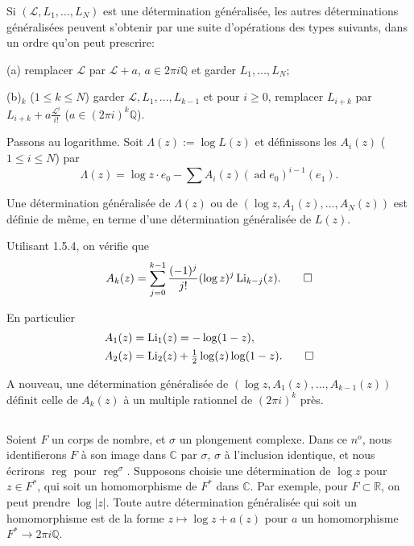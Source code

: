 \documentclass[12pt,a4paper]{article}
\theoremstyle{plain}
\theoremstyle{definition}
\theoremstyle{remark}
\DeclareMathOperator{\reg}{reg}
\DeclareMathOperator{\ad}{ad}
\newcommand{\Q}{\mathbb{Q}}
\newcommand{\R}{\mathbb{R}}
\newcommand{\C}{\mathbb{C}}
\begin{document}
Si $(\mathcal{L},L_1,\ldots,L_N)$ est une d\'etermination g\'en\'eralis\'ee, les autres d\'eterminations g\'en\'eralis\'ees peuvent s'obtenir par une suite d'op\'erations des types suivants, dans un ordre qu'on peut prescrire:

(a) remplacer $\mathcal{L}$ par $\mathcal{L}+a$, $a\in 2\pi i\Q$ et garder $L_1,\ldots,L_N$;

(b)$_k$ ($1\leq k\leq N$) garder $\mathcal{L},L_1,\ldots,L_{k-1}$ et pour $i\geq 0$, remplacer $L_{i+k}$ par $L_{i+k}+a\frac{\mathcal{L}^i}{i!}$ ($a\in(2\pi i)^k\Q$).

Passons au logarithme. Soit $\Lambda(z):=\log L(z)$ et d\'efinissons les $A_i(z)$ ($1\leq i\leq N$) par
\begin{equation*}
\Lambda(z) = \log z\cdot e_0 - \sum A_i(z)(\ad e_0)^{i-1}(e_1).
\end{equation*}

Une d\'etermination g\'en\'eralis\'ee de $\Lambda(z)$ ou de $(\log z,A_1(z),\ldots,A_N(z))$ est d\'efinie de m\^eme, en terme d'une d\'etermination g\'en\'eralis\'ee de $L(z)$.

Utilisant 1.5.4, on v\'erifie que
\begin{equation*}
A_k(z) = \sum_{j=0}^{k-1}\frac{(-1)^j}{j!}(\log z)^j\operatorname{Li}_{k-j}(z).\qedhere
\end{equation*}

En particulier
\begin{align*}
A_1(z) &= \operatorname{Li}_1(z) = -\log(1-z),\\
A_2(z) &= \operatorname{Li}_2(z) + \tfrac{1}{2}\log(z)\log(1-z).\qedhere
\end{align*}

A nouveau, une d\'etermination g\'en\'eralis\'ee de $(\log z,A_1(z),\ldots,A_{k-1}(z))$ d\'efinit celle de $A_k(z)$ {\`a} un multiple rationnel de $(2\pi i)^k$ pr\`es.

\subsection{}

Soient $F$ un corps de nombre, et $\sigma$ un plongement complexe. Dans ce $n^o$, nous identifierons $F$ {\`a} son image dans $\C$ par $\sigma$, $\sigma$ {\`a} l'inclusion identique, et nous \'ecrirons $\reg$ pour $\reg^\sigma$. Supposons choisie une d\'etermination de $\log z$ pour $z\in F^*$, qui soit un homomorphisme de $F^*$ dans $\C$. Par exemple, pour $F\subset\R$, on peut prendre $\log|z|$. Toute autre d\'etermination g\'en\'eralis\'ee qui soit un homomorphisme est de la forme $z\mapsto\log z+a(z)$ pour $a$ un homomorphisme $F^*\to 2\pi i\Q$.
\end{document}
